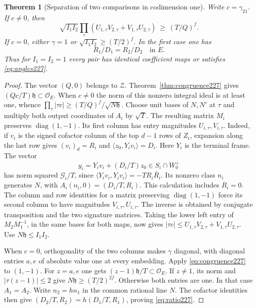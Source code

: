 \documentclass[a4paper,11pt]{article}
\newtheorem{theorem}[proposition]{Theorem}
\theoremstyle{definition}
\theoremstyle{remark}
\numberwithin{equation}{section}
\begin{document}
\begin{theorem}[Separation of two comparisons in codimension one]
\label{thm:separation227}
Write \(c=\gamma_{21}\). If \(c\ne0\), then
\begin{equation}
 \sqrt{I_1I_2}\prod_{\tau}
       (U_{1,\tau}V_{2,\tau}+V_{1,\tau}U_{2,\tau})
                    \ \ge\ (T/Q)^f .                  \label{eq:angles227}
\end{equation}
If \(c=0\), either \(\gamma=1\) or
\(\sqrt{I_1I_2}\ge (T/2)^f\). In the first case one has
\begin{equation}
                        R_1/D_1=R_2/D_2\quad\text{in }E.
                        \label{eq:ratio227}
\end{equation}
Thus for \(I_1=I_2=1\) every pair has identical coefficient
maps or satisfies \eqref{eq:angles227}.
\end{theorem}
\begin{proof}
The vector \((Q,0)\) belongs to \(\mathcal Z\). Theorem~\ref{thm:congruence227}
gives \((Qc/T)\mathfrak h\subset\mathcal O_E\). When \(c\ne0\)
the norm of this nonzero integral ideal is at least one, whence
\(\prod_\tau|\tau c|\ge (T/Q)^f/\sqrt{N\mathfrak h}\).
Choose unit bases of \(N,N'\) at \(\tau\) and multiply both
output coordinates of \(A_i\) by \(\sqrt T\). The resulting
matrix \(M_i\) preserves \(\operatorname{diag}(1,-1)\).
Its first column has entry magnitudes \(U_{i,\tau},V_{i,\tau}\).
Indeed, if \(v_i\) is the signed cofactor column of the top
\(d-1\) rows of \(Z_i\), expansion along the last row gives
\((v_i)_d=R_i\) and \(\langle z_0,Y_i v_i\rangle=D_i\).
Here \(Y_i\) is the terminal frame. The vector
\[
       y_i=Y_iv_i+(D_i/T)z_0\in S_i\cap W_0^\perp
\]
has norm squared \(\mathcal G_i/T\), since
\(\langle Y_iv_i,Y_iv_i\rangle=-T R_i\bar R_i\).
Its nonzero class \(n_i\) generates \(N\), with
\(A_i(n_i,0)=(D_i/T,R_i)\). This calculation includes
\(R_i=0\). The column and row identities for a matrix
preserving \(\operatorname{diag}(1,-1)\) force its second
column to have magnitudes \(V_{i,\tau},U_{i,\tau}\).
The inverse is obtained by conjugate transposition and the
two signature matrices. Taking the lower left entry of
\(M_2M_1^{-1}\), in the same bases for both maps, now gives
\(|\tau c|\le U_{1,\tau}V_{2,\tau}+V_{1,\tau}U_{2,\tau}\).
Use \(N\mathfrak h\le I_1I_2\).

When \(c=0\), orthogonality of the two columns makes
\(\gamma\) diagonal, with diagonal entries \(a,e\) of
absolute value one at every embedding. Apply
\eqref{eq:congruence227} to \((1,-1)\). For \(z=a,e\)
one gets \((z-1)\mathfrak h/T\subset\mathcal O_E\).
If \(z\ne1\), its norm and \(|\tau(z-1)|\le2\) give
\(N\mathfrak h\ge(T/2)^{2f}\). Otherwise both entries
are one. In that case \(A_1=A_2\). Write \(n_2=h n_1\)
in the common rational line \(N\). The cofactor identities
then give \((D_2/T,R_2)=h(D_1/T,R_1)\), proving
\eqref{eq:ratio227}.
\end{proof}
\end{document}
